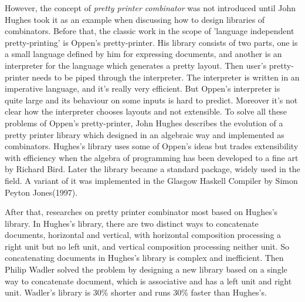 However, the concept of \textit{pretty printer combinator} was not introduced until John Hughes took it as an example when discussing how to design libraries of combinators\cite{hughes1995design}. Before that, the classic work in the scope of 'language independent pretty-printing' is Oppen's pretty-printer\cite{oppen1980prettyprinting}. His library consists of two parts, one is a small language defined by him for expressing documents, and another is an interpreter for the language which generates a pretty layout. Then user's pretty-printer needs to be piped through the interpreter. The interpreter is written in an imperative language, and it's really very efficient. But Oppen's interpreter is quite large and its behaviour on some inputs is hard to predict. Moreover it's not clear how the interpreter chooses layouts and not extensible. To solve all these problems of Oppen's pretty-printer, John Hughes describes the evolution of a pretty printer library which designed in an algebraic way and implemented as combinators. Hughes's library uses some of Oppen's ideas but trades extensibility with efficiency when the algebra of programming has been developed to a fine art by Richard Bird\cite{bird1996algebra}. Later the library became a standard package, widely used in the field. A variant of it was implemented in the Glasgow Haskell Compiler by Simon Peyton Jones(1997)\cite{wadler2003prettier}.

After that, researches on pretty printer combinator most based on Hughes's library. In Hughes's library, there are two distinct ways to concatenate documents, horizontal and vertical, with horizontal composition processing a right unit but no left unit, and vertical composition processing neither unit\cite{wadler2003prettier}. So concatenating documents in Hughes's library is complex and inefficient. Then Philip Wadler solved the problem by designing a new library based on a single way to concatenate document, which is associative and has a left unit and right unit\cite{wadler2003prettier}. Wadler's library is 30\% shorter and runs 30\% faster than Hughes's.





